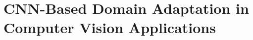 \section{CNN-Based Domain Adaptation in Computer Vision Applications} \label{sec:domain_adaption_CV}

\begin{comment}
\subsection{Domain Conditioned Adaptation Network}
Li et al. \cite{li2020} propose a domain conditioned adaptation network (DCAN), which contains two separate modules to reduce the domain discrepancy. After each task-specific layer a domain conditioned feature correction block estimates and reduces the domain discrepancy based on the MMD metric. In the CNN backbone an attention module regulates the extraction of domain-specific and -independent features. The proportions of domain-specific and -independent features is learned to decrease the domain discrepancy. Fig. \ref{fig:DCAN_model} visualizes the domain adaptation modules in the DCAN model.

\subsubsection{Domain Conditioned Channel Attention Mechanism}
ResNet is used as a backbone network, which allows an easy implementation of the domain conditioned channel attention module in its residual block. In the latent feature maps, the processed images are represented as $\pmb{X}_{t} = [X^{1}_{t},...,X^{C}_{t}] \in \mathbb{R}^{HxWxC}$, where H and W are the spatial dimension and C the number of image channels. First, a channel-wise global average pooling layer is applied, which reduces the images to  $\pmb{g}_{t} = [g^{1}_{t},...,g^{C}_{t}] \in \mathbb{R}^{1x1xC}$. Afterwards, the data is split depending on its domain and passed through different fully connected layers. The upper flow is used for target and the lower flow for source domain samples. The two different source and target domain routes share parameters. For both domains, an attention mechanism is trained jointly to learn activating different channels in the domain samples. This allows extracting more enriched domain-specific features. In the fully connected layers the dimension is first reduced with a ratio ${1x1x\frac{C}{r}}$ and later reconstructed to its original size ${1x1xC}$. ReLU and Sigmoid functions are applied. The domain-wise feature selection is achieved by weighting the channels of the feature representations $\pmb{X}_{s}$ and $\pmb{X}_{t}$ with the channel attention vectors $\pmb{v}_{s}$ and $\pmb{v}_{t}$ calculated by the domain conditioned channel attention module:


\end{comment}
